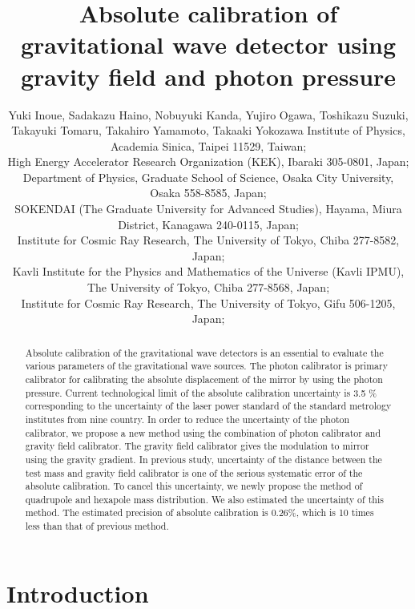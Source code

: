 \documentclass[A4]{spie}  %
\title{Absolute calibration of gravitational wave detector using gravity field and photon pressure}
\author{Yuki Inoue\supit{a,b}, Sadakazu Haino\supit{a}, Nobuyuki Kanda\supit{c}, Yujiro Ogawa\supit{b,d}, Toshikazu Suzuki\supit{b,e,f}, Takayuki Tomaru\supit{b,d,e,f}, Takahiro Yamamoto\supit{g}, Takaaki Yokozawa\supit{g}
\skiplinehalf
\supit{a}Institute of Physics, Academia Sinica, Taipei 11529, Taiwan; \\
\supit{b}High Energy Accelerator Research Organization (KEK), Ibaraki 305-0801, Japan;\\
\supit{c}Department of Physics, Graduate School of Science, Osaka City University, Osaka 558-8585, Japan;\\
\supit{d}SOKENDAI (The Graduate University for Advanced Studies), Hayama, Miura District, Kanagawa 240-0115, Japan;\\
\supit{e}Institute for Cosmic Ray Research, The University of Tokyo, Chiba 277-8582, Japan;\\
\supit{f}Kavli Institute for the Physics and Mathematics of the Universe (Kavli IPMU), The University of Tokyo, Chiba 277-8568, Japan;\\
\supit{g}Institute for Cosmic Ray Research, The University of Tokyo, Gifu 506-1205, Japan;\\
}
\begin{document}
 
\maketitle 

\begin{abstract}
Absolute calibration of the gravitational wave detectors is an essential to evaluate the various parameters of the gravitational wave sources. 
The photon calibrator is primary calibrator for calibrating the absolute displacement of the mirror by using the photon pressure. 
Current technological limit of the absolute calibration uncertainty is 3.5 \% corresponding to the uncertainty of the laser power standard of the standard metrology institutes from nine country.  In order to reduce the uncertainty of the photon calibrator, we propose a new method using the combination of photon calibrator and gravity field calibrator. The gravity field calibrator gives the modulation to mirror using the gravity gradient. In previous study, uncertainty of the distance between the test mass and gravity field calibrator is one of the serious systematic error of the absolute calibration. To cancel this uncertainty, we newly propose the method of quadrupole and hexapole mass distribution.  We also estimated the uncertainty of this method. The estimated precision of absolute calibration is 0.26\%, which is 10 times less than that of previous method.

\end{abstract}



\section{Introduction}
\end{document}
